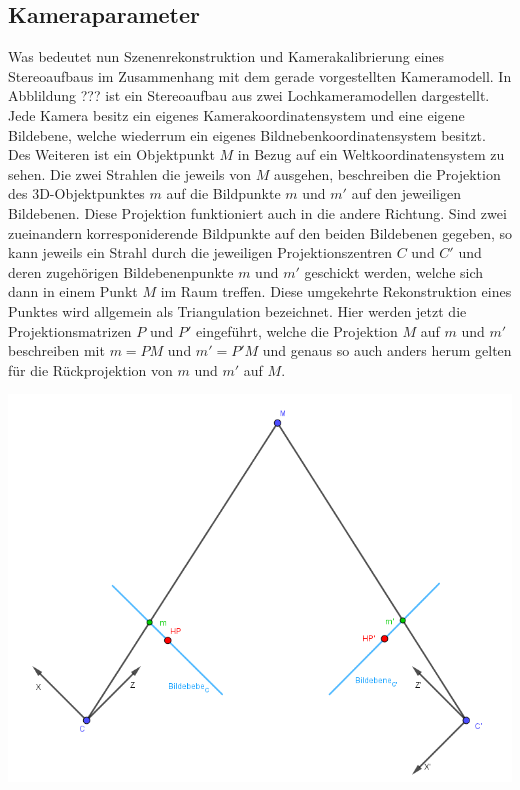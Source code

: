\subsection{Kameraparameter}

Was bedeutet nun Szenenrekonstruktion und Kamerakalibrierung eines Stereoaufbaus im Zusammenhang mit dem gerade vorgestellten Kameramodell. In Abblildung ??? ist ein Stereoaufbau aus zwei Lochkameramodellen dargestellt. Jede Kamera besitz ein eigenes Kamerakoordinatensystem und eine eigene Bildebene, welche wiederrum ein eigenes Bildnebenkoordinatensystem besitzt. Des Weiteren ist ein Objektpunkt $M$ in Bezug auf ein Weltkoordinatensystem zu sehen. Die zwei Strahlen die jeweils von $M$ ausgehen, beschreiben die Projektion des 3D-Objektpunktes $m$ auf die Bildpunkte $m$ und $m'$ auf den jeweiligen Bildebenen. Diese Projektion funktioniert auch in die andere Richtung. Sind zwei zueinandern korresponiderende Bildpunkte auf den beiden Bildebenen gegeben, so kann jeweils ein Strahl durch die jeweiligen Projektionszentren $C$ und $C'$ und deren zugehörigen Bildebenenpunkte $m$ und $m'$ geschickt werden, welche sich dann in einem Punkt $M$ im Raum treffen. Diese umgekehrte Rekonstruktion eines Punktes  wird allgemein als Triangulation bezeichnet\cite{HZ}. Hier werden jetzt die Projektionsmatrizen $P$ und $P'$ eingeführt, welche die Projektion $M$ auf $m$ und $m'$ beschreiben mit $m = PM$ und $m' = P'M$ und genaus so auch anders herum gelten für die Rückprojektion von $m$ und $m'$ auf $M$\cite{CamerModels.,HZ}.\\


	\begin{minipage}{\linewidth}
	\centering
	\includegraphics[width=.8\linewidth]{images/StereokopischerAufbauLochKamerModell.png}
	\label{fig:StereoaufbauLochkamermodell}
\end{minipage}\\

